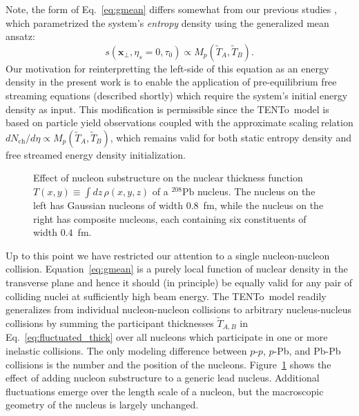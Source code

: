 \documentclass[aps,prc,reprint,amsmath,nofootinbib]{revtex4-1}
\newcommand{\trento}{T\raisebox{-0.5ex}{R}ENTo}
\newcommand{\nch}{N_\text{ch}}
\newcommand{\T}{\tilde{T}}
\newcommand{\xv}{\mathbf x}
\begin{document}
Note, the form of Eq.~\eqref{eq:gmean} differs somewhat from our previous studies \cite{Moreland:2014oya, Bernhard:2016tnd}, which parametrized the system's \emph{entropy} density using the generalized mean ansatz:
\begin{equation}
  s(\xv_\perp, \eta_s=0, \tau_0) \propto M_p(\T_A, \T_B).
\end{equation}
Our motivation for reinterpretting the left-side of this equation as an energy density in the present work is to enable the application of pre-equilibrium free streaming equations (described shortly) which require the system's initial energy density as input.
This modification is permissible since the \trento\ model is based on particle yield observations coupled with the approximate scaling relation $d\nch/d\eta \propto M_p(\T_A, \T_B)$, which remains valid for both static entropy density and free streamed energy density initialization.

\begin{figure}
  \caption{\label{fig:thickness} Effect of nucleon substructure on the nuclear thickness function $T(x, y) \equiv \int dz\, \rho(x, y, z)$ of a $^{208}\mathrm{Pb}$ nucleus. The nucleus on the left has Gaussian nucleons of width $0.8$~fm, while the nucleus on the right has composite nucleons, each containing six constituents of width $0.4$~fm.}
\end{figure}

Up to this point we have restricted our attention to a single nucleon-nucleon collision.
Equation~\eqref{eq:gmean} is a purely local function of nuclear density in the transverse plane and hence it should (in principle) be equally valid for any pair of colliding nuclei at sufficiently high beam energy.
The \trento\ model readily generalizes from individual nucleon-nucleon collisions to arbitrary nucleus-nucleus collisions by summing the participant thicknesses $\T_{A,B}$ in Eq.~\eqref{eq:fluctuated_thick} over all nucleons which participate in one or more inelastic collisions.
The only modeling difference between $p$-$p$, $p$-Pb, and Pb-Pb collisions is the number and the position of the nucleons.
Figure~\ref{fig:thickness} shows the effect of adding nucleon substructure to a generic lead nucleus.
Additional fluctuations emerge over the length scale of a nucleon, but the macroscopic geometry of the nucleus is largely unchanged.
\end{document}
